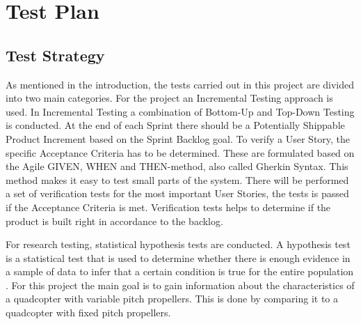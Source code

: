 \section{Test Plan}
\subsection{Test Strategy}
As mentioned in the introduction, the tests carried out in this project are divided into two main categories. For the project an Incremental Testing approach is used. In Incremental Testing a combination of Bottom-Up and Top-Down Testing is conducted. At the end of each Sprint there should be a Potentially Shippable Product Increment based on the Sprint Backlog goal. To verify a User Story, the specific Acceptance Criteria has to be determined. These are formulated based on the Agile GIVEN, WHEN and THEN-method, also called Gherkin Syntax. This method makes it easy to test small parts of the system. There will be performed a set of verification tests for the most important User Stories, the tests is passed if the Acceptance Criteria is met. Verification tests helps to determine if the product is built right in accordance to the backlog.

For research testing, statistical hypothesis tests are conducted. A hypothesis test is a statistical test that is used to determine whether there is enough evidence in a sample of data to infer that a certain condition is true for the entire population \cite{statistikk3}. For this project the main goal is to gain information about the characteristics of a quadcopter with variable pitch propellers. This is done by comparing it to a quadcopter with fixed pitch propellers. \\

\newpage

